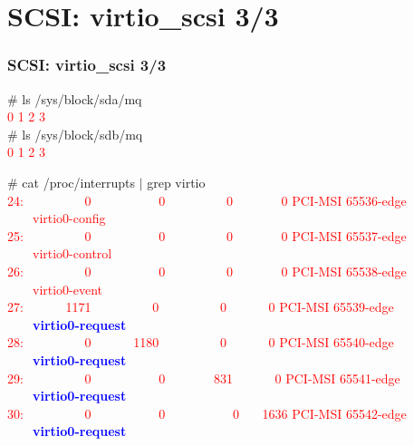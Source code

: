 \documentclass[aspectratio=169]{beamer}
\begin{document}
\section{SCSI: virtio\_scsi 3/3}
\begin{frame}
\frametitle{SCSI: virtio\_scsi 3/3}
\begin{block}{}
\# ls /sys/block/sda/mq \\
\textcolor{red}{0  1  2  3}\\
\# ls /sys/block/sdb/mq \\
\textcolor{red}{0  1  2  3}\\
\end{block}
\begin{block}{}
\# cat /proc/interrupts $|$ grep virtio \\
\textcolor{red}{ 24: \ \ \ \ \ \ \ \ \ 0 \ \ \ \ \ \ \ \ \ \ 0 \ \ \ \ \ \ \ \ \ 0 \ \ \ \ \ \ \ 0   PCI-MSI 65536-edge \ \ \ \ virtio0-config} \\
\textcolor{red}{ 25: \ \ \ \ \ \ \ \ \ 0 \ \ \ \ \ \ \ \ \ \ 0 \ \ \ \ \ \ \ \ \ 0 \ \ \ \ \ \ \ 0   PCI-MSI 65537-edge \ \ \ \ virtio0-control} \\
\textcolor{red}{ 26: \ \ \ \ \ \ \ \ \ 0 \ \ \ \ \ \ \ \ \ \ 0 \ \ \ \ \ \ \ \ \ 0 \ \ \ \ \ \ \ 0   PCI-MSI 65538-edge \ \ \ \ virtio0-event} \\
\textcolor{red}{ 27: \ \ \ \ \ \ 1171 \ \ \ \ \ \ \ \ \ 0 \ \ \ \ \ \ \ \ \ 0 \ \ \ \ \ \ 0   PCI-MSI 65539-edge \ \ \ \ \textbf{\textcolor{blue}{virtio0-request}}} \\
\textcolor{red}{ 28: \ \ \ \ \ \ \ \ \ 0 \ \ \ \ \ \ 1180 \ \ \ \ \ \ \ \ \ 0 \ \ \ \ \ \ 0  PCI-MSI 65540-edge \ \ \ \ \textbf{\textcolor{blue}{virtio0-request}}} \\
\textcolor{red}{ 29: \ \ \ \ \ \ \ \ \ 0 \ \ \ \ \ \ \ \ \ \ 0 \ \ \ \ \ \ \ 831 \ \ \ \ \ \ 0   PCI-MSI 65541-edge \ \ \ \ \textbf{\textcolor{blue}{virtio0-request}}} \\
\textcolor{red}{ 30: \ \ \ \ \ \ \ \ \ 0 \ \ \ \ \ \ \ \ \ \ 0 \ \ \ \ \ \ \ \ \ \ 0 \ \ \ 1636   PCI-MSI 65542-edge \ \ \ \ \textbf{\textcolor{blue}{virtio0-request}}}
\end{block}
\end{frame}

\end{document}
